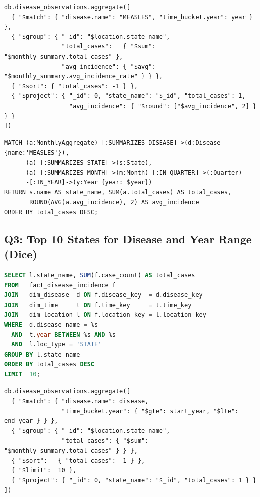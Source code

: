 \documentclass[12pt,a4paper]{article}
\begin{document}
\begin{lstlisting}[language={}, caption={Q2: MongoDB.}]
db.disease_observations.aggregate([
  { "$match": { "disease.name": "MEASLES", "time_bucket.year": year } },
  { "$group": { "_id": "$location.state_name",
                "total_cases":   { "$sum": "$monthly_summary.total_cases" },
                "avg_incidence": { "$avg": "$monthly_summary.avg_incidence_rate" } } },
  { "$sort": { "total_cases": -1 } },
  { "$project": { "_id": 0, "state_name": "$_id", "total_cases": 1,
                  "avg_incidence": { "$round": ["$avg_incidence", 2] } } }
])
\end{lstlisting}

\begin{lstlisting}[language=cypher, caption={Q2: Neo4j.}]
MATCH (a:MonthlyAggregate)-[:SUMMARIZES_DISEASE]->(d:Disease {name:'MEASLES'}),
      (a)-[:SUMMARIZES_STATE]->(s:State),
      (a)-[:SUMMARIZES_MONTH]->(m:Month)-[:IN_QUARTER]->(:Quarter)
      -[:IN_YEAR]->(y:Year {year: $year})
RETURN s.name AS state_name, SUM(a.total_cases) AS total_cases,
       ROUND(AVG(a.avg_incidence), 2) AS avg_incidence
ORDER BY total_cases DESC;
\end{lstlisting}


\subsection*{Q3: Top 10 States for Disease and Year Range (Dice)}

\begin{lstlisting}[language=SQL, caption={Q3: PostgreSQL.}]
SELECT l.state_name, SUM(f.case_count) AS total_cases
FROM   fact_disease_incidence f
JOIN   dim_disease  d ON f.disease_key  = d.disease_key
JOIN   dim_time     t ON f.time_key     = t.time_key
JOIN   dim_location l ON f.location_key = l.location_key
WHERE  d.disease_name = %s
  AND  t.year BETWEEN %s AND %s
  AND  l.loc_type = 'STATE'
GROUP BY l.state_name
ORDER BY total_cases DESC
LIMIT  10;
\end{lstlisting}

\begin{lstlisting}[language={}, caption={Q3: MongoDB.}]
db.disease_observations.aggregate([
  { "$match": { "disease.name": disease,
                "time_bucket.year": { "$gte": start_year, "$lte": end_year } } },
  { "$group": { "_id": "$location.state_name",
                "total_cases": { "$sum": "$monthly_summary.total_cases" } } },
  { "$sort":   { "total_cases": -1 } },
  { "$limit":  10 },
  { "$project": { "_id": 0, "state_name": "$_id", "total_cases": 1 } }
])
\end{lstlisting}
\end{document}
